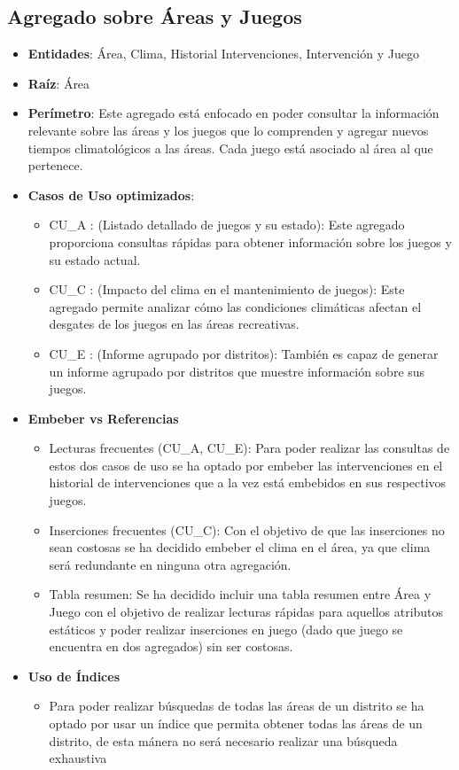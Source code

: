 \documentclass[]{article}
\begin{document}
\subsection{Agregado sobre Áreas y Juegos}
\label{sub_sec:agregado_area_juego}
\begin{itemize}
    \item \textbf{Entidades}: Área, Clima, Historial Intervenciones, Intervención y Juego
    \item \textbf{Raíz}: Área
    \item \textbf{Perímetro}: Este agregado está enfocado en poder consultar la información relevante sobre las áreas y los juegos que lo comprenden y agregar nuevos tiempos climatológicos a las áreas. Cada juego está asociado al área al que pertenece.
    \item \textbf{Casos de Uso optimizados}:
    \begin{itemize}
        \item CU\_A : (Listado detallado de juegos y su estado): Este agregado proporciona consultas rápidas para obtener información sobre los juegos y su estado actual. 
        \item CU\_C : (Impacto del clima en el mantenimiento de juegos): Este agregado permite analizar cómo las condiciones climáticas afectan el desgates de los juegos en las áreas recreativas.
        \item CU\_E : (Informe agrupado por distritos): También es capaz de generar un informe agrupado por distritos que muestre información sobre sus juegos. 
    \end{itemize}
    \item \textbf{Embeber vs Referencias}
    \begin{itemize}
        \item Lecturas frecuentes (CU\_A, CU\_E): Para poder realizar las consultas de estos dos casos de uso se ha optado por embeber las intervenciones en el historial de intervenciones que a la vez está embebidos en sus respectivos juegos.
        \item Inserciones frecuentes (CU\_C): Con el objetivo de que las inserciones no sean costosas se ha decidido embeber el clima en el área, ya que clima será redundante en ninguna otra agregación.
        \item Tabla resumen: Se ha decidido incluir una tabla resumen entre Área y Juego con el objetivo de realizar lecturas rápidas para aquellos atributos estáticos y poder realizar inserciones en juego (dado que juego se encuentra en dos agregados) sin ser costosas.
    \end{itemize}
    \item \textbf{Uso de Índices}
    \begin{itemize}
        \item Para poder realizar búsquedas de todas las áreas de un distrito se ha optado por usar un índice que permita obtener todas las áreas de un distrito, de esta mánera no será necesario realizar una búsqueda exhaustiva
    \end{itemize}
\end{itemize}
\end{document}

